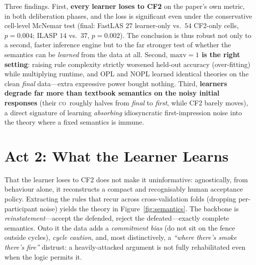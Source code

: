 \documentclass[11pt]{article}
\newcommand{\co}{\textsc{co}}
\begin{document}
Three findings. First, \textbf{every learner loses to CF2} on the paper's own metric, in both
deliberation phases, and the loss is significant even under the conservative cell-level McNemar
test (final: FastLAS $27$ learner-only vs.\ $54$ CF2-only cells, $p{=}0.004$; ILASP $14$ vs.\ $37$,
$p{=}0.002$). The \citeauthor{guillaume2022} conclusion is thus robust not only to a second, faster
inference engine but to the far stronger test of whether the semantics can be \emph{learned} from
the data at all. Second, \textbf{$\text{maxv}{=}1$ is the right setting}: raising rule complexity
strictly worsened held-out accuracy (over-fitting) while multiplying runtime, and OPL and NOPL
learned identical theories on the clean \emph{final} data---extra expressive power bought nothing.
Third, \textbf{learners degrade far more than textbook semantics on the noisy initial responses}
(their \co\ roughly halves from \emph{final} to \emph{first}, while CF2 barely moves), a direct
signature of learning \emph{absorbing} idiosyncratic first-impression noise into the theory where a
fixed semantics is immune.

\section{Act 2: What the Learner Learns}
\label{sec:act2}

That the learner loses to CF2 does not make it uninformative: agnostically, from behaviour alone,
it reconstructs a compact and recognisably human acceptance policy. Extracting the rules that recur
across cross-validation folds (dropping per-participant noise) yields the theory in
Figure~\ref{fig:semantics}. The backbone is \emph{reinstatement}---accept the defended, reject the
defeated---exactly complete semantics. Onto it the data adds a \emph{commitment bias} (do not sit
on the fence outside cycles), \emph{cycle caution}, and, most distinctively, a
\emph{``where there's smoke there's fire''} distrust: a heavily-attacked argument is not fully
rehabilitated even when the logic permits it.
\end{document}
